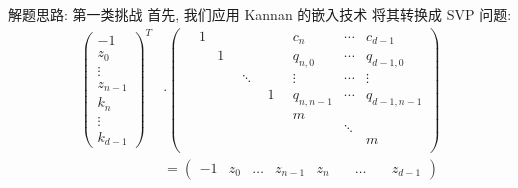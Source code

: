 \documentclass[10pt,compress]{beamer}
\begin{document}
\begin{frame}{解题思路: 第一类挑战}
  首先, 我们应用 Kannan 的嵌入技术 \cite{Kannan1987} 将其转换成 SVP 问题:
  \medbreak
  \pause
  $$
  \begin{aligned}
    \begin{pmatrix}
      -1 \\ z_0 \\ \vdots \\ z_{n-1} \\ k_n \\ \vdots \\ k_{d-1}
    \end{pmatrix}^T
    &\cdot
    \begin{pmatrix}
      \quad 1 &\quad &\quad &\quad &c_n &\cdots &c_{d-1} \\
      &1 & & &q_{n,0} &\cdots &q_{d-1,0} \\
      & &\ddots & &\vdots &\cdots &\vdots \\
      & & &1 &q_{n,n-1} &\cdots &q_{d-1,n-1} \\
      & & & &m & & \\
      & & & & &\ddots & \\
      & & & & & &m \\
    \end{pmatrix} \\
    &=
    \begin{pmatrix}
      -1 &z_0 &\ldots &z_{n-1} &z_n &\quad\ldots &\quad z_{d-1}
    \end{pmatrix}
  \end{aligned}
  $$
\end{frame}
\end{document}

